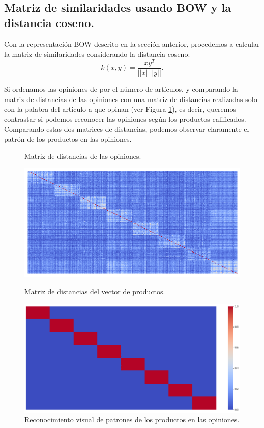 \documentclass[paper=letter, fontsize=11pt]{scrartcl}
\numberwithin{equation}{section} %
\numberwithin{figure}{section} %
\numberwithin{table}{section} %
\begin{document}
\subsection{Matriz de similaridades usando BOW y la distancia coseno.}
Con la representación BOW descrito en la sección anterior, procedemos a calcular la matriz de similaridades considerando la distancia coseno:
$$k(x,y)=\frac{xy^T}{||x||||y||}.$$

Si ordenamos las opiniones de por el número de artículos, y comparando la matriz de distancias de las opiniones con una matriz de distancias realizadas solo con la palabra del artículo a que opinan (ver Figura \ref{fig:productos_distancia}), es decir, queremos contrastar si podemos reconocer las opiniones según los productos calificados. Comparando estas dos matrices de distancias, podemos observar claramente el patrón de los productos en las opiniones.

\begin{figure}[!htb]
\caption{Matriz de distancias de las opiniones.}
  \includegraphics[width=\linewidth]{figure/bow_productos_distancia.png}
\endminipage\hfill
{}
\caption{Matriz de distancias del vector de productos.}
  \includegraphics[width=\linewidth]{figure/productos_distancia.png}
\endminipage
\caption{Reconocimiento visual de patrones de los productos en las opiniones.}
\label{fig:productos_distancia}
\end{figure}
\end{document}
